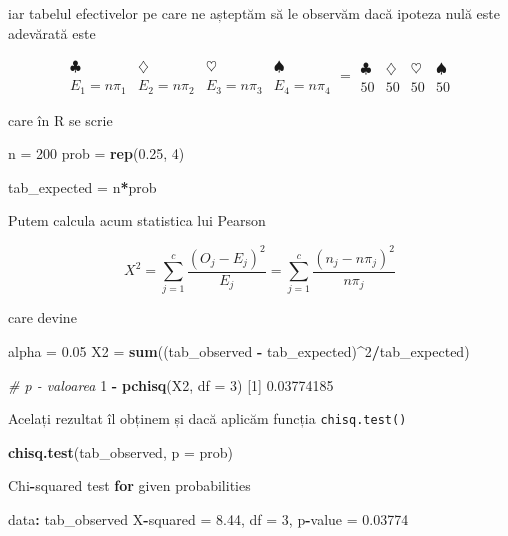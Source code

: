 \documentclass[]{article}
\newenvironment{Shaded}{\begin{snugshade}}{\end{snugshade}}
\newcommand{\KeywordTok}[1]{\textcolor[rgb]{0.13,0.29,0.53}{\textbf{#1}}}
\newcommand{\DataTypeTok}[1]{\textcolor[rgb]{0.13,0.29,0.53}{#1}}
\newcommand{\DecValTok}[1]{\textcolor[rgb]{0.00,0.00,0.81}{#1}}
\newcommand{\FloatTok}[1]{\textcolor[rgb]{0.00,0.00,0.81}{#1}}
\newcommand{\StringTok}[1]{\textcolor[rgb]{0.31,0.60,0.02}{#1}}
\newcommand{\CommentTok}[1]{\textcolor[rgb]{0.56,0.35,0.01}{\textit{#1}}}
\newcommand{\ControlFlowTok}[1]{\textcolor[rgb]{0.13,0.29,0.53}{\textbf{#1}}}
\newcommand{\OperatorTok}[1]{\textcolor[rgb]{0.81,0.36,0.00}{\textbf{#1}}}
\newcommand{\NormalTok}[1]{#1}
\begin{document}
iar tabelul efectivelor pe care ne așteptăm să le observăm dacă ipoteza
nulă este adevărată este

\[
\begin{array}{c|c|c|c}
  \clubsuit & \diamondsuit & \heartsuit & \spadesuit \\
  \hline
  E_1 = n\pi_1 & E_2 = n\pi_2 & E_3 = n\pi_3 & E_4 = n\pi_4
\end{array} 
=
\begin{array}{c|c|c|c}
  \clubsuit & \diamondsuit & \heartsuit & \spadesuit \\
  \hline
  50 & 50 & 50 & 50
\end{array}
\]

care în R se scrie

\begin{Shaded}
\begin{Highlighting}[]
\NormalTok{n =}\StringTok{ }\DecValTok{200}
\NormalTok{prob =}\StringTok{ }\KeywordTok{rep}\NormalTok{(}\FloatTok{0.25}\NormalTok{, }\DecValTok{4}\NormalTok{)}

\NormalTok{tab_expected =}\StringTok{ }\NormalTok{n}\OperatorTok{*}\NormalTok{prob}
\end{Highlighting}
\end{Shaded}

Putem calcula acum statistica lui Pearson

\[
  X^2 = \sum_{j = 1}^{c}\frac{(O_{j} - E_{j})^2}{E_{j}} = \sum_{j = 1}^{c}\frac{\left(n_{j} - n \pi_j\right)^2}{n \pi_j}
\]

care devine

\begin{Shaded}
\begin{Highlighting}[]
\NormalTok{alpha =}\StringTok{ }\FloatTok{0.05}
\NormalTok{X2 =}\StringTok{ }\KeywordTok{sum}\NormalTok{((tab_observed }\OperatorTok{-}\StringTok{ }\NormalTok{tab_expected)}\OperatorTok{^}\DecValTok{2}\OperatorTok{/}\NormalTok{tab_expected)}

\CommentTok{# p - valoarea}
\DecValTok{1} \OperatorTok{-}\StringTok{ }\KeywordTok{pchisq}\NormalTok{(X2, }\DataTypeTok{df =} \DecValTok{3}\NormalTok{)}
\NormalTok{[}\DecValTok{1}\NormalTok{] }\FloatTok{0.03774185}
\end{Highlighting}
\end{Shaded}

Acelați rezultat îl obținem și dacă aplicăm funcția
\texttt{chisq.test()}

\begin{Shaded}
\begin{Highlighting}[]
\KeywordTok{chisq.test}\NormalTok{(tab_observed, }\DataTypeTok{p =}\NormalTok{ prob)}

\NormalTok{    Chi}\OperatorTok{-}\NormalTok{squared test }\ControlFlowTok{for}\NormalTok{ given probabilities}

\NormalTok{data}\OperatorTok{:}\StringTok{  }\NormalTok{tab_observed}
\NormalTok{X}\OperatorTok{-}\NormalTok{squared =}\StringTok{ }\FloatTok{8.44}\NormalTok{, df =}\StringTok{ }\DecValTok{3}\NormalTok{, p}\OperatorTok{-}\NormalTok{value =}\StringTok{ }\FloatTok{0.03774}
\end{Highlighting}
\end{Shaded}
\end{document}
